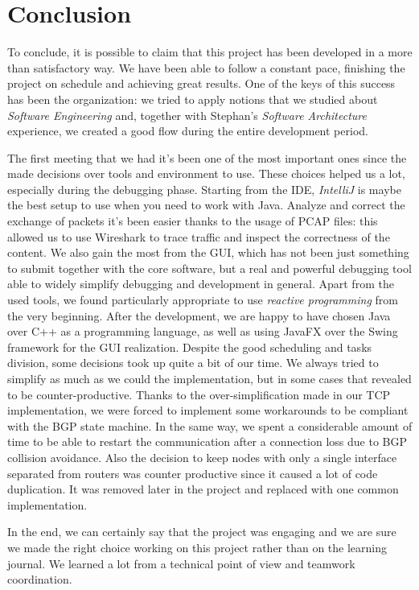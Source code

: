 \chapter{Conclusion}
To conclude, it is possible to claim that this project has been developed in a more than satisfactory way.
We have been able to follow a constant pace, finishing the project on schedule and achieving great results.
One of the keys of this success has been the organization: we tried to apply notions that we studied about \textit{Software Engineering} and, together with Stephan's \textit{Software Architecture} experience, we created a good flow during the entire development period.

The first meeting that we had it's been one of the most important ones since the made decisions over tools and environment to use. These choices helped us a lot, especially during the debugging phase. Starting from the IDE, \textit{IntelliJ} is maybe the best setup to use when you need to work with Java. Analyze and correct the exchange of packets it's been easier thanks to the usage of PCAP files: this allowed us to use Wireshark to trace traffic and inspect the correctness of the content.
We also gain the most from the GUI, which has not been just something to submit together with the core software, but a real and powerful debugging tool able to widely simplify debugging and development in general.
Apart from the used tools, we found particularly appropriate to use \textit{reactive programming} from the very beginning. After the development, we are happy to have chosen Java over C++ as a programming language, as well as using JavaFX over the Swing framework for the GUI realization.
Despite the good scheduling and tasks division, some decisions took up quite a bit of our time. We always tried to simplify as much as we could the implementation, but in some cases that revealed to be counter-productive. Thanks to the over-simplification made in our TCP implementation, we were forced to implement some workarounds to be compliant with the BGP state machine. In the same way, we spent a considerable amount of time to be able to restart the communication after a connection loss due to BGP collision avoidance. Also the decision to keep nodes with only a single interface separated from routers was counter productive since it caused a lot of code duplication. It was removed later in the project and replaced with one common implementation.

In the end, we can certainly say that the project was engaging and we are sure we made the right choice working on this project rather than on the learning journal. We learned a lot from a technical point of view and teamwork coordination.
